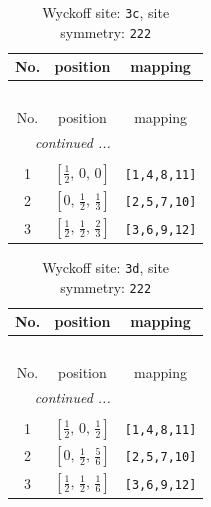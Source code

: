 \documentclass[fleqn,8pt]{jsarticle}
\begin{document}
\renewcommand{\arraystretch}{1.2}
\begin{longtable}{ccc}
\caption{Wyckoff site: {\tt 3c}, site symmetry: {\tt 222}}
 \\
 \hline \hline
No. & position & mapping \\ \hline \endfirsthead

\multicolumn{2}{l}{\tablename\ \thetable{}} \\
 \hline \hline
No. & position & mapping \\ \hline \endhead

 \hline \hline
\multicolumn{2}{r}{\footnotesize\it continued ...} \\ \endfoot

 \hline \hline
\multicolumn{2}{r}{} \\ \endlastfoot

1 & $\left[ \frac{1}{2},\, 0,\, 0 \right]$ & {\tt [1,4,8,11]} \\ \hline
2 & $\left[ 0,\, \frac{1}{2},\, \frac{1}{3} \right]$ & {\tt [2,5,7,10]} \\ \hline
3 & $\left[ \frac{1}{2},\, \frac{1}{2},\, \frac{2}{3} \right]$ & {\tt [3,6,9,12]} \\
\end{longtable}
\renewcommand{\arraystretch}{1.2}
\begin{longtable}{ccc}
\caption{Wyckoff site: {\tt 3d}, site symmetry: {\tt 222}}
 \\
 \hline \hline
No. & position & mapping \\ \hline \endfirsthead

\multicolumn{2}{l}{\tablename\ \thetable{}} \\
 \hline \hline
No. & position & mapping \\ \hline \endhead

 \hline \hline
\multicolumn{2}{r}{\footnotesize\it continued ...} \\ \endfoot

 \hline \hline
\multicolumn{2}{r}{} \\ \endlastfoot

1 & $\left[ \frac{1}{2},\, 0,\, \frac{1}{2} \right]$ & {\tt [1,4,8,11]} \\ \hline
2 & $\left[ 0,\, \frac{1}{2},\, \frac{5}{6} \right]$ & {\tt [2,5,7,10]} \\ \hline
3 & $\left[ \frac{1}{2},\, \frac{1}{2},\, \frac{1}{6} \right]$ & {\tt [3,6,9,12]} \\
\end{longtable}
\renewcommand{\arraystretch}{1.2}
\end{document}
